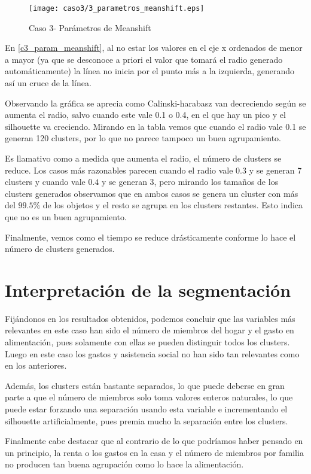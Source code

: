 \begin{figure}[H]
\caption{Caso 3- Parámetros de Meanshift}
\label{c3_param_meanshift}
\texttt{[image: caso3/3\_parametros\_meanshift.eps]}
\end{figure}


En \eqref{c3_param_meanshift}, al no estar los valores en el eje x ordenados de menor a mayor (ya que se desconoce a priori el valor que tomará el radio generado automáticamente) la línea no inicia por el punto más a la izquierda, generando así un cruce de la línea.

Observando la gráfica se aprecia como Calinski-harabasz van decreciendo según se aumenta el radio, salvo cuando este vale 0.1 o 0.4, en el que hay un pico y el silhouette va creciendo. Mirando en la tabla vemos que cuando el radio vale 0.1 se generan 120 clusters, por lo que no parece tampoco un buen agrupamiento.

Es llamativo como a medida que aumenta el radio, el número de clusters se reduce. Los casos más razonables parecen cuando el radio vale $0.3$ y se generan 7 clusters y cuando vale $0.4$ y se generan 3, pero mirando los tamaños de los clusters generados observamos que en ambos casos se genera un cluster con más del $99.5\%$ de los objetos y el resto se agrupa en los clusters restantes. Esto indica que no es un buen agrupamiento.

Finalmente, vemos como el tiempo se reduce drásticamente conforme lo hace el número de clusters generados.



\section{Interpretación de la segmentación}


Fijándonos en los resultados obtenidos, podemos concluir que las variables más relevantes en este caso han sido el número de miembros del hogar y el gasto en alimentación, pues solamente con ellas se pueden distinguir todos los clusters. Luego en este caso los gastos y asistencia social no han sido tan relevantes como en los anteriores.

Además, los clusters están bastante separados, lo que puede deberse en gran parte a que el número de miembros solo toma valores enteros naturales, lo que puede estar forzando una separación usando esta variable e incrementando el silhouette artificialmente, pues premia mucho la separación entre los clusters.

Finalmente cabe destacar que al contrario de lo que podríamos haber pensado en un principio, la renta o los gastos en la casa y el número de miembros por familia no producen tan buena agrupación como lo hace la alimentación.





